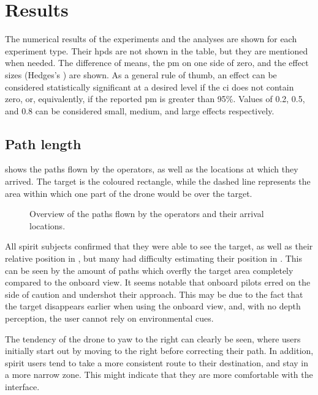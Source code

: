 \chapter{Results}
\label{ch:results}
The numerical results of the experiments and the analyses are shown for each experiment type.
Their \glspl{hpd} are not shown in the table, but they are mentioned when needed.
The difference of means, the \gls{pm} on one side of zero, and the effect sizes (Hedges's ) are shown.
As a general rule of thumb, an effect can be considered statistically significant at a desired level if the \gls{ci} does not contain zero, or, equivalently, if the reported \gls{pm} is greater than 95\%.
Values of 0.2, 0.5, and 0.8 can be considered small, medium, and large effects respectively.\cite{sawilowsky2009new}

  \section{Path length}
   shows the paths flown by the operators, as well as the locations at which they arrived.
  The target is the coloured rectangle, while the dashed line represents the area within which one part of the drone would be over the target.

  \begin{figure}[h]
    \centering
    
    \caption[Paths overview]{Overview of the paths flown by the operators and their arrival locations.}
    \label{fig:paths_overview}
  \end{figure}

  All \gls{spirit} subjects confirmed that they were able to see the target, as well as their relative position in , but many had difficulty estimating their position in .
  This can be seen by the amount of paths which overfly the target area completely compared to the onboard view.
  It seems notable that onboard pilots erred on the side of caution and undershot their approach.
  This may be due to the fact that the target disappears earlier when using the onboard view, and, with no depth perception, the user cannot rely on environmental cues.

  The tendency of the drone to yaw to the right can clearly be seen, where users initially start out by moving to the right before correcting their path.
  In addition, \gls{spirit} users tend to take a more consistent route to their destination, and stay in a more narrow zone.
  This might indicate that they are more comfortable with the interface.

